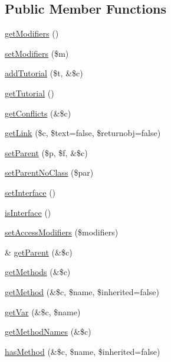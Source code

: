 \subsection*{\-Public \-Member \-Functions}
\begin{DoxyCompactItemize}
\item 
\hyperlink{classparser_class_a781d75979d7792ce3e5e4dcf79a623c9}{get\-Modifiers} ()
\item 
\hyperlink{classparser_class_aaf5a37db0e5ff1e3deb9a3c575b325f6}{set\-Modifiers} (\$m)
\item 
\hyperlink{classparser_class_a116fb717ca229f334cb23c2a9e6fd8ba}{add\-Tutorial} (\$t, \&\$c)
\item 
\hyperlink{classparser_class_a715fae8f190b69fed3659b0d836c5477}{get\-Tutorial} ()
\item 
\hyperlink{classparser_class_a3c0cda054b642b0209ddc1d36f1c061e}{get\-Conflicts} (\&\$c)
\item 
\hyperlink{classparser_class_a06461a82056b3b599f7011fdf0840877}{get\-Link} (\$c, \$text=false, \$returnobj=false)
\item 
\hyperlink{classparser_class_a2288227e0d81ea2c281d193f3c0cf81e}{set\-Parent} (\$p, \$f, \&\$c)
\item 
\hyperlink{classparser_class_a46b009b343aaf4e11f89dc7cd2aa44d4}{set\-Parent\-No\-Class} (\$par)
\item 
\hyperlink{classparser_class_a8cdd3bbc122729b62587172d9fabb0ef}{set\-Interface} ()
\item 
\hyperlink{classparser_class_a24085f1d1916b88922901502e2b96edb}{is\-Interface} ()
\item 
\hyperlink{classparser_class_aea52d895e5476cdde296aae06ba13a64}{set\-Access\-Modifiers} (\$modifiers)
\item 
\& \hyperlink{classparser_class_a622c229b9927fc52cb20147f32af46eb}{get\-Parent} (\&\$c)
\item 
\hyperlink{classparser_class_a8f3ffb8fc08179dadd74f54623e029d7}{get\-Methods} (\&\$c)
\item 
\hyperlink{classparser_class_a9998a7439fc132e72faf7ccf27d291b7}{get\-Method} (\&\$c, \$name, \$inherited=false)
\item 
\hyperlink{classparser_class_a97422c7522ed1bbdb01a9da54ff9ec8d}{get\-Var} (\&\$c, \$name)
\item 
\hyperlink{classparser_class_ad80c0f03152a41a45b782438bebeccef}{get\-Method\-Names} (\&\$c)
\item 
\hyperlink{classparser_class_af8a4ad9f134e3aa7117c39eea7d3df59}{has\-Method} (\&\$c, \$name, \$inherited=false)

\end{DoxyCompactItemize}
